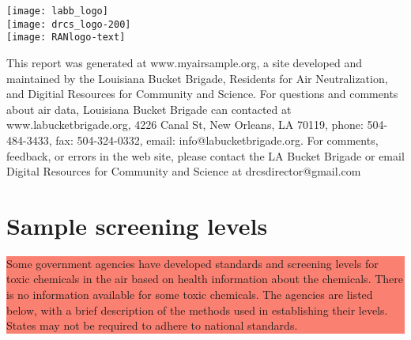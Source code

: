 \documentclass{article}
\newlength\acklength
\newlength\logowidth
\newcommand{\highlightbox}[1]{\colorbox{salmon}{\parbox{\linewidth}{#1}}}
\begin{document}
     \vfill
     \parbox{\logowidth}{
       \texttt{[image: labb\_logo]}\\
       \vskip 0.1in
       \texttt{[image: drcs\_logo-200]}\\
       \vskip 0.1in
       \texttt{[image: RANlogo-text]}
     }
     \setlength\acklength{\textwidth}
     \addtolength\acklength{-\logowidth}
     \addtolength\acklength{-0.7in}
     \hskip 0.5in
     \parbox{\acklength}{
       \sloppy
       This report was generated at www.myairsample.org, a site
       \linebreak
       developed and maintained by the Louisiana Bucket Brigade,
       \linebreak
       Residents for Air Neutralization, and Digitial Resources for
       \linebreak
       Community and Science.  For questions and comments about air
       data, Louisiana Bucket Brigade can contacted at
       www.labucketbrigade.org, 4226 Canal St, New Orleans, LA 70119,
       phone: 504-484-3433, fax: 504-324-0332, email:
       info@labucketbrigade.org.  For comments, feedback, or errors in
       the web site, please contact the LA Bucket Brigade or email
       Digital Resources for Community and Science at
       drcsdirector@gmail.com
     }

\thispagestyle{empty}



\section*{Sample screening levels}

\highlightbox{Some government agencies have developed standards and screening levels for
toxic chemicals in the air based on health information about the chemicals.
There is no information available for some toxic chemicals. The agencies are
listed below, with a brief description of the methods used in establishing their
levels. States may not be required to adhere to national standards.}

\begin{itemize}
\end{itemize}
\end{document}
